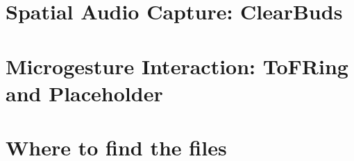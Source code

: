 \documentclass [11pt, proquest] {uwthesis}[2020/02/24]
\begin{document}
\chapter{Spatial Audio Capture: ClearBuds}


\chapter{Microgesture Interaction: ToFRing and Placeholder}





%
%
\nocite{*}   %


%
%
\appendix
\raggedbottom\sloppy
 
 
\chapter{Where to find the files}
 
\end{document}
